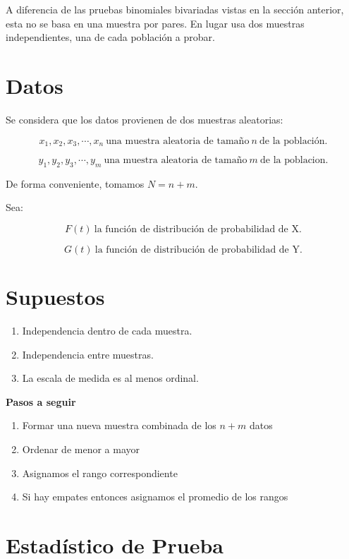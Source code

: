 \documentclass[
  a4paper,
  oneside,
  openany]{book}
\begin{document}
A diferencia de las pruebas binomiales bivariadas vistas en la sección anterior, esta no se basa en una muestra por pares. En lugar usa dos muestras independientes, una de cada población a probar.

\hypertarget{datos-5}{%
\section{Datos}\label{datos-5}}

Se considera que los datos provienen de dos muestras aleatorias:

\[x_{1},x_{2},x_{3},\cdots,x_{n} \ \mbox{una muestra aleatoria de tamaño} \ n \ \mbox{de la población.}\]

\[y_{1},y_{2},y_{3},\cdots,y_{m} \ \mbox{una muestra aleatoria de tamaño} \  m \  \mbox{de la poblacion.}\]

De forma conveniente, tomamos \(N=n+m\).

Sea:

\[F(t) \ \mbox{la función de distribución de probabilidad de X.}\]

\[G(t) \ \mbox{la función de distribución de probabilidad de Y.}\]

\hypertarget{supuestos-5}{%
\section{Supuestos}\label{supuestos-5}}

\begin{enumerate}
\def\labelenumi{\arabic{enumi})}
\item
  Independencia dentro de cada muestra.
\item
  Independencia entre muestras.
\item
  La escala de medida es al menos ordinal.
\end{enumerate}

\textbf{Pasos a seguir}

\begin{enumerate}
\def\labelenumi{\arabic{enumi}.}
\item
  Formar una nueva muestra combinada de los \(n+m\) datos
\item
  Ordenar de menor a mayor
\item
  Asignamos el rango correspondiente
\item
  Si hay empates entonces asignamos el promedio de los rangos
\end{enumerate}

\hypertarget{estaduxedstico-de-prueba-5}{%
\section{Estadístico de Prueba}\label{estaduxedstico-de-prueba-5}}
\end{document}

